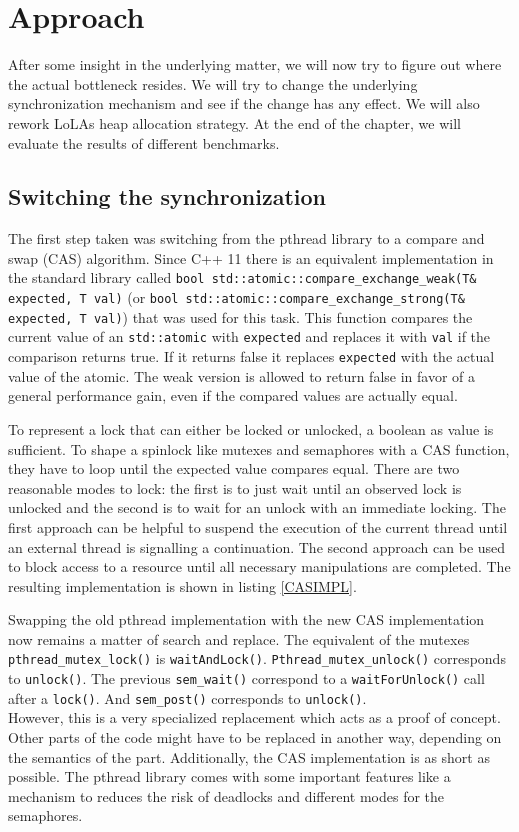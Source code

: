 

\chapter{Approach}
After some insight in the underlying matter, we will now try to figure out where the actual bottleneck resides. We will try to change the underlying synchronization mechanism and see if the change has any effect. We will also rework LoLAs heap allocation strategy. At the end of the chapter, we will evaluate the results of different benchmarks.

\section{Switching the synchronization}
The first step taken was switching from the pthread library to a compare and swap (CAS) algorithm. Since C++ 11 there is an equivalent implementation in the standard library called \texttt{bool std::atomic::compare\_exchange\_weak(T\& expected, T val)} (or \texttt{bool std::atomic::compare\_exchange\_strong(T\& expected, T val)}) that was used for this task. This function compares the current value of an \texttt{std::atomic} with \texttt{expected} and replaces it with \texttt{val} if the comparison returns true. If it returns false it replaces \texttt{expected} with the actual value of the atomic. The weak version is allowed to return false in favor of a general performance gain, even if the compared values are actually equal.

To represent a lock that can either be locked or unlocked, a boolean as value is sufficient. To shape a spinlock like mutexes and semaphores with a CAS function, they have to loop until the expected value compares equal. There are two reasonable modes to lock: the first is to just wait until an observed lock is unlocked and the second is to wait for an unlock with an immediate locking. The first approach can be helpful to suspend the execution of the current thread until an external thread is signalling a continuation. The second approach can be used to block access to a resource until all necessary manipulations are completed. The resulting implementation is shown in listing \ref{CASIMPL}.

Swapping the old pthread implementation with the new CAS implementation now remains a matter of search and replace. The equivalent of the mutexes \texttt{pthread\_mutex\_lock()} is \texttt{waitAndLock()}. \texttt{Pthread\_mutex\_unlock()} corresponds to \texttt{unlock()}. The previous \texttt{sem\_wait()} correspond to a \texttt{waitForUnlock()} call after a \texttt{lock()}. And \texttt{sem\_post()} corresponds to \texttt{unlock()}.\\
However, this is a very specialized replacement which acts as a proof of concept. Other parts of the code might have to be replaced in another way, depending on the semantics of the part. Additionally, the CAS implementation is as short as possible. The pthread library comes with some important features like a mechanism to reduces the risk of deadlocks and different modes for the semaphores.

